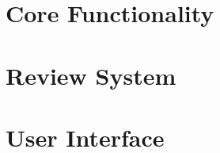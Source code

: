 \documentclass[a4paper,oneside]{memoir}
\begin{document}






\part{Core Functionality}













\part{Review System}





\part{User Interface}




\backmatter
\end{document}
